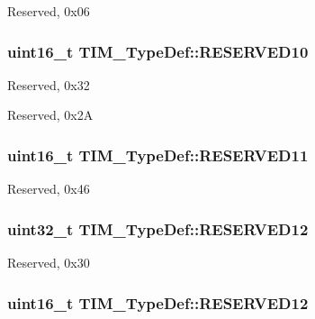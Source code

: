 Reserved, 0x06 \hypertarget{struct_t_i_m___type_def_ab0e228ff39a37b472aa48ba3afd18333}{
\subsubsection[{R\-E\-S\-E\-R\-V\-E\-D10}]{\setlength{\rightskip}{0pt plus 5cm}uint16\-\_\-t T\-I\-M\-\_\-\-Type\-Def\-::\-R\-E\-S\-E\-R\-V\-E\-D10}}\label{struct_t_i_m___type_def_ab0e228ff39a37b472aa48ba3afd18333}
Reserved, 0x32

Reserved, 0x2\-A \hypertarget{struct_t_i_m___type_def_a7a96436f300141eb48768ffa90ee6e71}{
\subsubsection[{R\-E\-S\-E\-R\-V\-E\-D11}]{\setlength{\rightskip}{0pt plus 5cm}uint16\-\_\-t T\-I\-M\-\_\-\-Type\-Def\-::\-R\-E\-S\-E\-R\-V\-E\-D11}}\label{struct_t_i_m___type_def_a7a96436f300141eb48768ffa90ee6e71}
Reserved, 0x46 \hypertarget{struct_t_i_m___type_def_aebbca147242a5ef58c8d5fe097df2ca5}{
\subsubsection[{R\-E\-S\-E\-R\-V\-E\-D12}]{\setlength{\rightskip}{0pt plus 5cm}uint32\-\_\-t T\-I\-M\-\_\-\-Type\-Def\-::\-R\-E\-S\-E\-R\-V\-E\-D12}}\label{struct_t_i_m___type_def_aebbca147242a5ef58c8d5fe097df2ca5}
Reserved, 0x30 \hypertarget{struct_t_i_m___type_def_a994061b8b26ae9b2e8ddb981cb3eec11}{
\subsubsection[{R\-E\-S\-E\-R\-V\-E\-D12}]{\setlength{\rightskip}{0pt plus 5cm}uint16\-\_\-t T\-I\-M\-\_\-\-Type\-Def\-::\-R\-E\-S\-E\-R\-V\-E\-D12}}\label{struct_t_i_m___type_def_a994061b8b26ae9b2e8ddb981cb3eec11}
